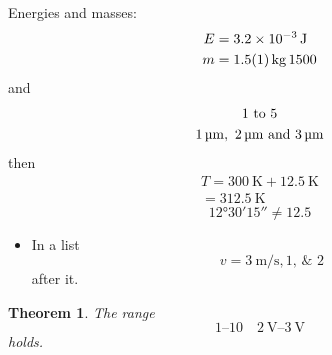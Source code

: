 \documentclass{article}
\newtheorem{theorem}{Theorem}
\begin{document}
Energies and masses:
\begin{align}
  E &= \qty{3.2e-3}{\joule} \\
  m &= \SI{1.5 \pm 0.1}{\kilo\gram}\,\num{1500}
\end{align}
and
\begin{gather*}
  \numrange{1}{5} \\
  \qtylist{1;2;3}{\micro\metre}
\end{gather*}
then
\begin{multline}
  T = \qty{300}{\kelvin} + \qty{12.5}{\kelvin} \\
  = \qty{312.5}{\kelvin}
\end{multline}
\begin{equation}
  \ang{12;30;15} \neq \num{12.5}
\end{equation}
\begin{itemize}
\item In a list \[ v = \qty{3}{\metre\per\second}, \numlist{1;2} \] after it.
\end{itemize}
\begin{theorem}
The range \[ \numrange{1}{10} \quad \qtyrange{2}{3}{\volt} \] holds.
\end{theorem}
\end{document}
